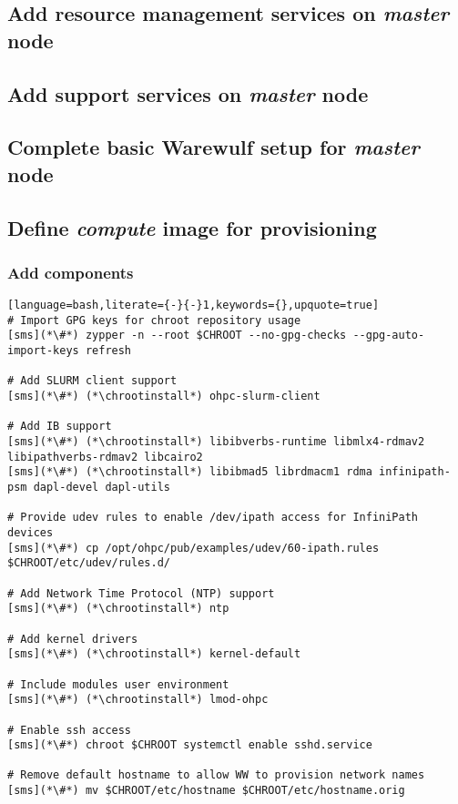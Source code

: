 \documentclass[letterpaper]{article}
\newcommand{\chrootinstall}{zypper -n --root \$CHROOT install}
\begin{document}
\subsection{Add resource management services on {\em master} node} \label{sec:add_rm}


\subsection{Add \InfiniBand{} support services on {\em master} node} \label{sec:add_ofed}


\subsection{Complete basic Warewulf setup for {\em master} node} \label{sec:setup_ww}



\subsection{Define {\em compute} image for provisioning}


\subsubsection{Add \OHPC{} components} \label{sec:add_components}


\begin{lstlisting}[language=bash,literate={-}{-}1,keywords={},upquote=true]
# Import GPG keys for chroot repository usage
[sms](*\#*) zypper -n --root $CHROOT --no-gpg-checks --gpg-auto-import-keys refresh

# Add SLURM client support
[sms](*\#*) (*\chrootinstall*) ohpc-slurm-client

# Add IB support
[sms](*\#*) (*\chrootinstall*) libibverbs-runtime libmlx4-rdmav2 libipathverbs-rdmav2 libcairo2
[sms](*\#*) (*\chrootinstall*) libibmad5 librdmacm1 rdma infinipath-psm dapl-devel dapl-utils

# Provide udev rules to enable /dev/ipath access for InfiniPath devices
[sms](*\#*) cp /opt/ohpc/pub/examples/udev/60-ipath.rules $CHROOT/etc/udev/rules.d/

# Add Network Time Protocol (NTP) support
[sms](*\#*) (*\chrootinstall*) ntp

# Add kernel drivers
[sms](*\#*) (*\chrootinstall*) kernel-default

# Include modules user environment
[sms](*\#*) (*\chrootinstall*) lmod-ohpc

# Enable ssh access 
[sms](*\#*) chroot $CHROOT systemctl enable sshd.service

# Remove default hostname to allow WW to provision network names
[sms](*\#*) mv $CHROOT/etc/hostname $CHROOT/etc/hostname.orig
\end{lstlisting}
\end{document}
